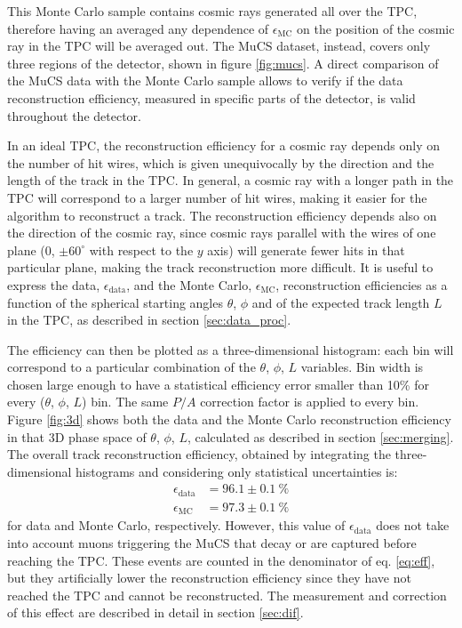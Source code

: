 \documentclass[a4paper,11pt]{article}
\begin{document}
This Monte Carlo sample contains cosmic rays generated all over the TPC, therefore  having an averaged any dependence of $\epsilon_{\mathrm{MC}}$ on the position of the cosmic ray in the TPC will be averaged out. The MuCS dataset, instead, covers only three regions of the detector, shown in figure \ref{fig:mucs}. A direct comparison of the MuCS data with the Monte Carlo sample allows to verify if the data reconstruction efficiency, measured in specific parts of the detector, is valid throughout the detector.

In an ideal TPC, the reconstruction efficiency for a cosmic ray depends only on the number of hit wires, which is given unequivocally by the direction and the length of the track in the TPC. In general, a cosmic ray with a longer path in the TPC will correspond to a larger number of hit wires, making it easier for the algorithm to reconstruct a track. The reconstruction efficiency depends also on the direction of the cosmic ray, since cosmic rays parallel with the wires of one plane (0, $\pm60^{\circ}$ with respect to the $y$ axis) will generate fewer hits in that particular plane, making the track reconstruction more difficult.
It is useful to express the data, $\epsilon_{\mathrm{data}}$, and the Monte Carlo, $\epsilon_{\mathrm{MC}}$, reconstruction efficiencies as a function of the spherical starting angles $\theta$, $\phi$ and of the expected track length $L$ in the TPC, as described in section \ref{sec:data_proc}.

The efficiency can then be plotted as a three-dimensional histogram: each bin will correspond to a particular combination of the $\theta$, $\phi$, $L$ variables. Bin width is chosen large enough to have a statistical efficiency error smaller than 10\% for every ($\theta$, $\phi$, $L$) bin. The same $P/A$ correction factor is applied to every bin. Figure \ref{fig:3d} shows both the data and the Monte Carlo reconstruction efficiency in that 3D phase space of $\theta$, $\phi$, $L$, calculated as described in section \ref{sec:merging}. The overall track reconstruction efficiency, obtained by integrating the three-dimensional histograms and considering only statistical uncertainties is:
\begin{align*}
\epsilon_{\mathrm{data}} &= 96.1 \pm 0.1~\%\\
\epsilon_{\mathrm{MC}} &= 97.3 \pm 0.1~\%
\end{align*} for data and Monte Carlo, respectively. However, this value of $\epsilon_{\mathrm{data}}$ does not take into account muons triggering the MuCS that decay or are captured before reaching the TPC. These events are counted in the denominator of eq. \eqref{eq:eff}, but they artificially lower the reconstruction efficiency since they have not reached the TPC and cannot be reconstructed. The measurement and correction of this effect are described in detail in section \ref{sec:dif}.
\end{document}
